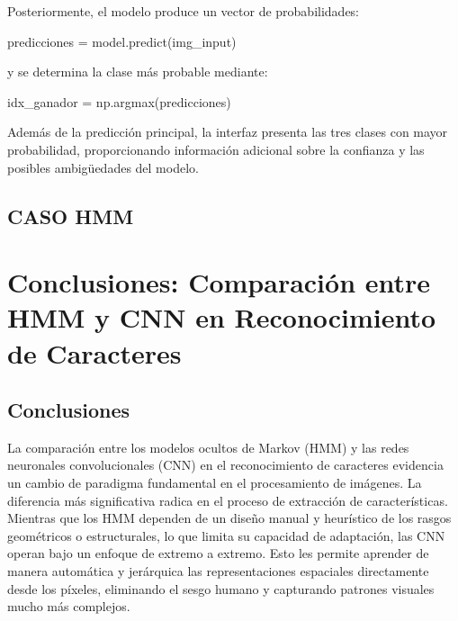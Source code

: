 \documentclass[
  spanish,
  us-letterpaper,
  DIV=11,
  numbers=noendperiod]{scrreprt}
\newenvironment{Shaded}{\begin{snugshade}}{\end{snugshade}}
\newcommand{\NormalTok}[1]{\textcolor[rgb]{0.00,0.23,0.31}{#1}}
\newcommand{\OperatorTok}[1]{\textcolor[rgb]{0.37,0.37,0.37}{#1}}
\begin{document}
Posteriormente, el modelo produce un vector de probabilidades:

\begin{Shaded}
\begin{Highlighting}[]
\NormalTok{predicciones }\OperatorTok{=}\NormalTok{ model.predict(img\_input)}
\end{Highlighting}
\end{Shaded}

y se determina la clase más probable mediante:

\begin{Shaded}
\begin{Highlighting}[]
\NormalTok{idx\_ganador }\OperatorTok{=}\NormalTok{ np.argmax(predicciones)}
\end{Highlighting}
\end{Shaded}

Además de la predicción principal, la interfaz presenta las tres clases
con mayor probabilidad, proporcionando información adicional sobre la
confianza y las posibles ambigüedades del modelo.

\section{CASO HMM}\label{caso-hmm}


\chapter{Conclusiones: Comparación entre HMM y CNN en Reconocimiento de
Caracteres}\label{conclusiones-comparaciuxf3n-entre-hmm-y-cnn-en-reconocimiento-de-caracteres}

\section{Conclusiones}\label{conclusiones}

La comparación entre los modelos ocultos de Markov (HMM) y las redes
neuronales convolucionales (CNN) en el reconocimiento de caracteres
evidencia un cambio de paradigma fundamental en el procesamiento de
imágenes. La diferencia más significativa radica en el proceso de
extracción de características. Mientras que los HMM dependen de un
diseño manual y heurístico de los rasgos geométricos o estructurales, lo
que limita su capacidad de adaptación, las CNN operan bajo un enfoque de
extremo a extremo. Esto les permite aprender de manera automática y
jerárquica las representaciones espaciales directamente desde los
píxeles, eliminando el sesgo humano y capturando patrones visuales mucho
más complejos.
\end{document}
